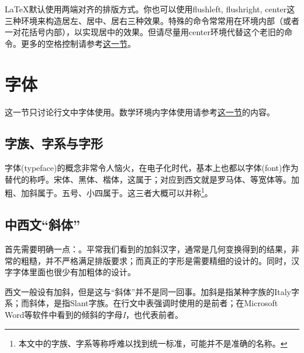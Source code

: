 {\LaTeX 默认使用两端对齐的排版方式。你也可以使用flushleft, flushright, center这三种环境来构造居左、居中、居右三种效果。特殊的\latexline{\\centering}命令常常用在环境内部（或者一对花括号内部），以实现居中的效果。但请尽量用center环境代替这个老旧的命令。更多的空格控制请参考\hyperref[sec:hvspace]{这一节}。

\section{字体}
\label{sec:font}
这一节只讨论行文中字体使用。数学环境内字体使用请参考\hyperref[sec:mathfont]{这一节}的内容。

\subsection{字族、字系与字形}
字体(typeface)的概念非常令人恼火，在电子化时代，基本上也都以字体(font)作为替代的称呼。宋体、黑体、楷体，这属于；对应到西文就是罗马体、等宽体等。加粗、加斜属于。五号、小四属于。这三者大概可以并称\footnote{本文中的字族、字系等称呼难以找到统一标准，可能并不是准确的名称。}。

\subsection{中西文“斜体”}
首先需要明确一点：。平常我们看到的加斜汉字，通常是几何变换得到的结果，非常的粗糙，并不严格满足排版要求；而真正的字形是需要精细的设计的。同时，汉字字体里面也很少有加粗体的设计。

西文一般设有加斜，但是这与“斜体”并不是同一回事。加斜是指某种字族的Italy字系；而斜体，是指Slant字族。在行文中表强调时使用的是前者；在Microsoft Word等软件中看到的倾斜的字母\textit{I}，也代表前者。

}
